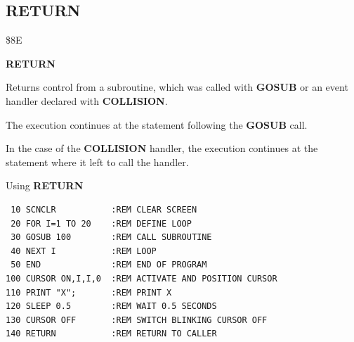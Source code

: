 \subsection{RETURN}
\begin{description}[leftmargin=2cm,style=nextline]
\item [Token:] \$8E
\item [Format:] {\bf RETURN}
\item [Usage:]  Returns control from a subroutine, which
                was called with {\bf GOSUB} or an event
                handler declared with {\bf COLLISION}.

                The execution continues at the statement
                following the {\bf GOSUB} call.

                In the case of the {\bf COLLISION} handler,
                the execution continues at the statement
                where it left to call the handler.

\item [Example:] Using {\bf RETURN}

\begin{tcolorbox}[colback=black,coltext=white]
\verbatimfont{\codefont}
\begin{verbatim}
 10 SCNCLR           :REM CLEAR SCREEN
 20 FOR I=1 TO 20    :REM DEFINE LOOP
 30 GOSUB 100        :REM CALL SUBROUTINE
 40 NEXT I           :REM LOOP
 50 END              :REM END OF PROGRAM
100 CURSOR ON,I,I,0  :REM ACTIVATE AND POSITION CURSOR
110 PRINT "X";       :REM PRINT X
120 SLEEP 0.5        :REM WAIT 0.5 SECONDS
130 CURSOR OFF       :REM SWITCH BLINKING CURSOR OFF
140 RETURN           :REM RETURN TO CALLER
\end{verbatim}
\end{tcolorbox}
\end{description}


\newpage
